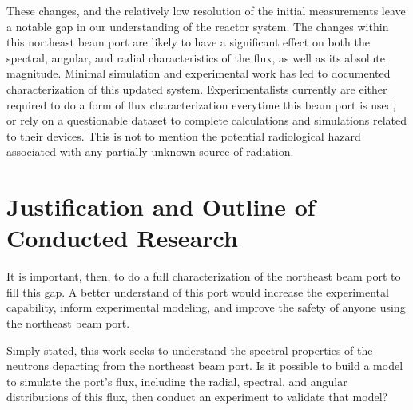 These changes, and the relatively low resolution of the initial measurements leave a notable gap in our understanding of the reactor system.
The changes within this northeast beam port are likely to have a significant effect on both the spectral, angular, and radial characteristics of the flux, as well as its absolute magnitude.
Minimal simulation and experimental work has led to documented characterization of this updated system.
Experimentalists currently are either required to do a form of flux characterization everytime this beam port is used, or rely on a questionable dataset to complete calculations and simulations related to their devices.
This is not to mention the potential radiological hazard associated with any partially unknown source of radiation.



\section{Justification and Outline of Conducted Research}
It is important, then, to do a full characterization of the northeast beam port to fill this gap.
A better understand of this port would increase the experimental capability, inform experimental modeling, and improve the safety of anyone using the northeast beam port.

Simply stated, this work seeks to understand the spectral properties of the neutrons departing from the northeast beam port.
Is it possible to build a model to simulate the port's flux, including the radial, spectral, and angular distributions of this flux, then conduct an experiment to validate that model?

